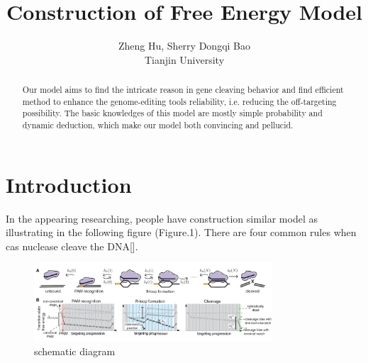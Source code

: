 \documentclass[a4paper,10pt]{article}
\title{Construction of Free Energy Model}
\author{Zheng Hu, Sherry Dongqi Bao \\ Tianjin University}
\begin{document}
	\maketitle
	
	\begin{abstract}
	Our model aims to find the intricate reason in gene cleaving behavior and find efficient method to enhance the genome-editing tools reliability, i.e. reducing the off-targeting possibility.
	The basic knowledges of this model are mostly simple probability and dynamic deduction, which make our model both convincing and pellucid.
	\end{abstract}
	
	
	\printbibliography
	\section{Introduction}
	In the appearing researching, people have construction similar model as illustrating in the following figure (Figure.1). There are four common rules when cas nuclease cleave the DNA[].
		\begin{figure}[tbph]
		\centering
		\includegraphics[width=3.5in]{1}
		\caption{schematic diagram}
		\label{fig:1}
		\end{figure}
\end{document}
